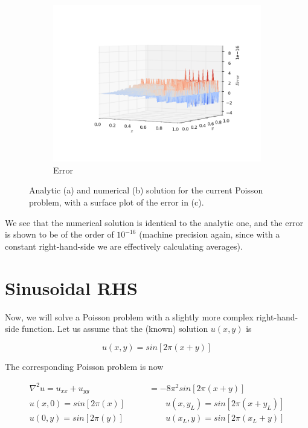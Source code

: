 \documentclass[11pt]{report}
\begin{document}
\begin{figure}[h!]
\begin{subfigure}{0.6\textwidth}
  \includegraphics[width=1.0\linewidth]{images/example2_error}
  \caption{Error}
  \label{fig:sub2.3}
\end{subfigure}
\caption{Analytic (a) and numerical (b) solution for the current Poisson problem, with a surface plot of the  error in (c).}
\label{fig:example2}
\end{figure}

We see that the numerical solution is identical to the analytic one, and the error is shown to be of the order of $10^{-16}$ (machine precision again, since with a constant right-hand-side we are effectively calculating averages). 

\newpage
\section{Sinusoidal RHS}
Now, we will solve a Poisson problem with a slightly more complex right-hand-side function. Let us assume that the (known) solution $u(x,y)$ is 

\begin{equation}
u(x,y) = sin\left[ 2\pi \left( x + y\right) \right]
\end{equation}

The corresponding Poisson problem is now

\begin{subequations}
\begin{align}
\nabla ^2 u = u_{xx} + u_{yy} &= -8\pi^2 sin\left[ 2\pi \left( x + y\right) \right] \\
u(x,0) = sin\left[ 2\pi \left( x \right) \right] \quad \quad & \quad \quad 
u(x,y_L) = sin\left[ 2\pi \left( x + y_L\right) \right]\\
u(0,y) =  sin\left[ 2\pi \left( y \right) \right] \quad \quad & \quad \quad 
u(x_L,y) =  sin\left[ 2\pi \left( x_L + y\right) \right]
\end{align}
\end{subequations}
\end{document}
